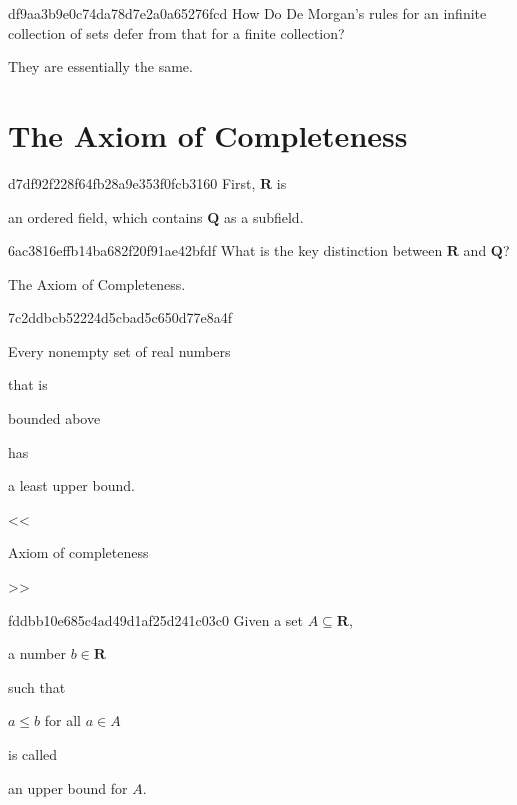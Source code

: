 \begin{note}{df9aa3b9e0c74da78d7e2a0a65276fcd}
    How Do De Morgan's rules for an infinite collection of sets defer from that for a finite collection?

    \begin{cloze}{1}
        They are essentially the same.
    \end{cloze}
\end{note}

\section{The Axiom of Completeness}
\begin{note}{d7df92f228f64fb28a9e353f0fcb3160}
    First, \({ \mathbf{R} }\) is \begin{icloze}{1}an ordered field, which contains \({ \mathbf{Q} }\) as a subfield.\end{icloze}
\end{note}

\begin{note}{6ac3816effb14ba682f20f91ae42bfdf}
    What is the key distinction between \({ \mathbf{R} }\) and \({ \mathbf{Q} }\)?

    \begin{cloze}{1}
        The Axiom of Completeness.
    \end{cloze}
\end{note}

\begin{note}{7c2ddbcb52224d5cbad5c650d77e8a4f}
    \begin{icloze}{1}Every nonempty set of real numbers\end{icloze} that is \begin{icloze}{2}bounded above\end{icloze} has \begin{icloze}{3}a least upper bound.\end{icloze}

    \begin{center}
        \tiny
        <<\begin{icloze}{4}Axiom of completeness\end{icloze}>>
    \end{center}
\end{note}

\begin{note}{fddbb10e685c4ad49d1af25d241c03c0}
    Given a set \({ A \subseteq \mathbf{R} }\), \begin{icloze}{3}a number \({ b \in \mathbf{R} }\)\end{icloze} such that \begin{icloze}{2}\({ a \leq b }\) for all \({ a \in A }\)\end{icloze} is called \begin{icloze}{1}an upper bound for \({ A }\).\end{icloze}
\end{note}

